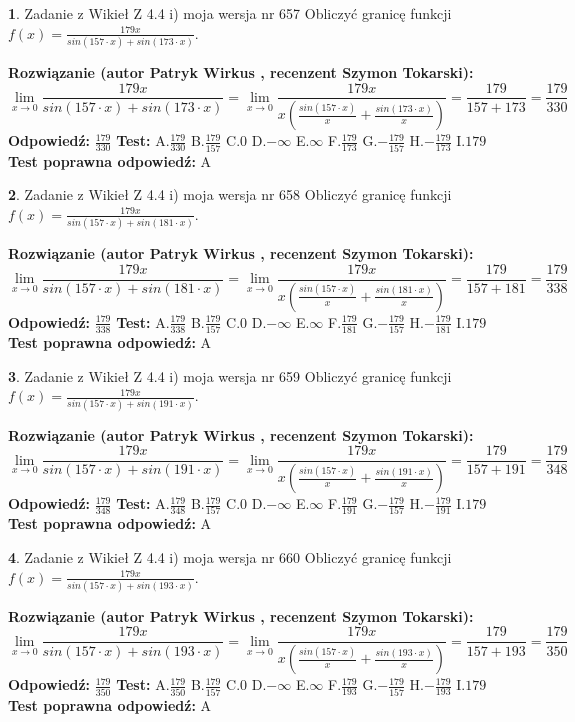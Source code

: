 \documentclass[12pt, a4paper]{article}
\theoremstyle{definition} %
\newtheorem{zad}{}
\newcommand{\zadStart}[1]{\begin{zad}#1\newline}
\newcommand{\zadStop}{\end{zad}}
\newcommand{\rozwStart}[2]{\noindent \textbf{Rozwiązanie (autor #1 , recenzent #2): }\newline}
\newcommand{\rozwStop}{\newline}
\newcommand{\odpStart}{\noindent \textbf{Odpowiedź:}\newline}
\newcommand{\odpStop}{\newline}
\newcommand{\testStart}{\noindent \textbf{Test:}\newline}
\newcommand{\testStop}{\newline}
\newcommand{\kluczStart}{\noindent \textbf{Test poprawna odpowiedź:}\newline}
\newcommand{\kluczStop}{\newline}
\begin{document}
\zadStart{Zadanie z Wikieł Z 4.4 i) moja wersja nr 657}
Obliczyć granicę funkcji $f(x)=\frac{179x}{sin(157\cdot x) +sin(173\cdot x)}$.
\zadStop
\rozwStart{Patryk Wirkus}{Szymon Tokarski}
$$\lim\limits_{x\to 0}\frac{179x}{sin(157\cdot x) +sin(173\cdot x)}=\lim\limits_{x\to 0}\frac{179x}{x(\frac{sin(157\cdot x)}{x}+\frac{sin(173\cdot x)}{x})}=\frac{179}{157+173} = \frac{179}{330}$$
\rozwStop
\odpStart
$\frac{179}{330}$
\odpStop
\testStart
A.$\frac{179}{330}$
B.$\frac{179}{157}$
C.$0$
D.$-\infty$
E.$\infty$
F.$\frac{179}{173}$
G.$-\frac{179}{157}$
H.$-\frac{179}{173}$
I.$179$
\testStop
\kluczStart
A
\kluczStop



\zadStart{Zadanie z Wikieł Z 4.4 i) moja wersja nr 658}
Obliczyć granicę funkcji $f(x)=\frac{179x}{sin(157\cdot x) +sin(181\cdot x)}$.
\zadStop
\rozwStart{Patryk Wirkus}{Szymon Tokarski}
$$\lim\limits_{x\to 0}\frac{179x}{sin(157\cdot x) +sin(181\cdot x)}=\lim\limits_{x\to 0}\frac{179x}{x(\frac{sin(157\cdot x)}{x}+\frac{sin(181\cdot x)}{x})}=\frac{179}{157+181} = \frac{179}{338}$$
\rozwStop
\odpStart
$\frac{179}{338}$
\odpStop
\testStart
A.$\frac{179}{338}$
B.$\frac{179}{157}$
C.$0$
D.$-\infty$
E.$\infty$
F.$\frac{179}{181}$
G.$-\frac{179}{157}$
H.$-\frac{179}{181}$
I.$179$
\testStop
\kluczStart
A
\kluczStop



\zadStart{Zadanie z Wikieł Z 4.4 i) moja wersja nr 659}
Obliczyć granicę funkcji $f(x)=\frac{179x}{sin(157\cdot x) +sin(191\cdot x)}$.
\zadStop
\rozwStart{Patryk Wirkus}{Szymon Tokarski}
$$\lim\limits_{x\to 0}\frac{179x}{sin(157\cdot x) +sin(191\cdot x)}=\lim\limits_{x\to 0}\frac{179x}{x(\frac{sin(157\cdot x)}{x}+\frac{sin(191\cdot x)}{x})}=\frac{179}{157+191} = \frac{179}{348}$$
\rozwStop
\odpStart
$\frac{179}{348}$
\odpStop
\testStart
A.$\frac{179}{348}$
B.$\frac{179}{157}$
C.$0$
D.$-\infty$
E.$\infty$
F.$\frac{179}{191}$
G.$-\frac{179}{157}$
H.$-\frac{179}{191}$
I.$179$
\testStop
\kluczStart
A
\kluczStop



\zadStart{Zadanie z Wikieł Z 4.4 i) moja wersja nr 660}
Obliczyć granicę funkcji $f(x)=\frac{179x}{sin(157\cdot x) +sin(193\cdot x)}$.
\zadStop
\rozwStart{Patryk Wirkus}{Szymon Tokarski}
$$\lim\limits_{x\to 0}\frac{179x}{sin(157\cdot x) +sin(193\cdot x)}=\lim\limits_{x\to 0}\frac{179x}{x(\frac{sin(157\cdot x)}{x}+\frac{sin(193\cdot x)}{x})}=\frac{179}{157+193} = \frac{179}{350}$$
\rozwStop
\odpStart
$\frac{179}{350}$
\odpStop
\testStart
A.$\frac{179}{350}$
B.$\frac{179}{157}$
C.$0$
D.$-\infty$
E.$\infty$
F.$\frac{179}{193}$
G.$-\frac{179}{157}$
H.$-\frac{179}{193}$
I.$179$
\testStop
\kluczStart
A
\kluczStop
\end{document}

